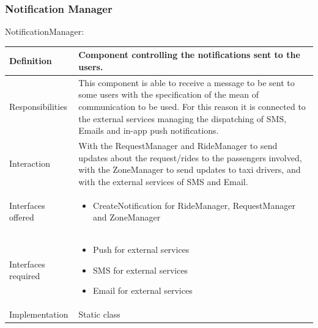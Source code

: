 \documentclass[a4paper,11pt]{report} %
\begin{document}
	\subsubsection{Notification Manager}
	\begin{minipage}{\linewidth}
	\end{minipage} \linebreak
	\centerline{NotificationManager:}
	\begin{center}
		\begin{tabular}{| l | p{9cm} |}\hline
			Definition & Component controlling the notifications sent to the users.\\\hline
			Responsibilities & This component is able to receive a message to be sent to some users with the specification of the mean of communication to be used. For this reason it is connected to the external services managing the dispatching of SMS, Emails and in-app push notifications.\\\hline
			Interaction & With the RequestManager and RideManager to send updates about the request/rides to the passengers involved, with the ZoneManager to send updates to taxi drivers, and with the external services of SMS and Email.\\\hline
			Interfaces offered & \begin{itemize}
				\item CreateNotification for RideManager, RequestManager and ZoneManager
			\end{itemize}\\\hline
			Interfaces required & \begin{itemize}
				\item Push for external services
				\item SMS for external services
				\item Email for external services
			\end{itemize}\\\hline
			Implementation & Static class\\\hline
		\end{tabular}
	\end{center}	
		
\end{document}
